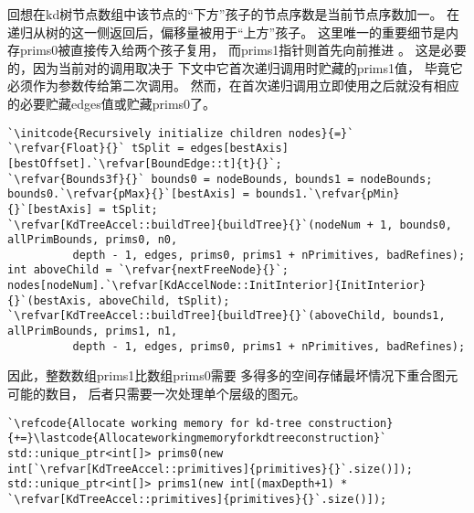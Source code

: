 回想在kd树节点数组中该节点的“下方”孩子的节点序数是当前节点序数加一。
在递归从树的这一侧返回后，偏移量被用于“上方”孩子。
这里唯一的重要细节是内存{\ttfamily prims0}被直接传入给两个孩子复用，
而{\ttfamily prims1}指针则首先向前推进
。
这是必要的，因为当前对的调用取决于
下文中它首次递归调用时贮藏的{\ttfamily prims1}值，
毕竟它必须作为参数传给第二次调用。
然而，在首次递归调用立即使用之后就没有相应的必要贮藏{\ttfamily edges}值或贮藏{\ttfamily prims0}了。
\begin{lstlisting}
`\initcode{Recursively initialize children nodes}{=}`
`\refvar{Float}{}` tSplit = edges[bestAxis][bestOffset].`\refvar[BoundEdge::t]{t}{}`;
`\refvar{Bounds3f}{}` bounds0 = nodeBounds, bounds1 = nodeBounds;
bounds0.`\refvar{pMax}{}`[bestAxis] = bounds1.`\refvar{pMin}{}`[bestAxis] = tSplit;
`\refvar[KdTreeAccel::buildTree]{buildTree}{}`(nodeNum + 1, bounds0, allPrimBounds, prims0, n0,
          depth - 1, edges, prims0, prims1 + nPrimitives, badRefines);
int aboveChild = `\refvar{nextFreeNode}{}`;
nodes[nodeNum].`\refvar[KdAccelNode::InitInterior]{InitInterior}{}`(bestAxis, aboveChild, tSplit);
`\refvar[KdTreeAccel::buildTree]{buildTree}{}`(aboveChild, bounds1, allPrimBounds, prims1, n1,
          depth - 1, edges, prims0, prims1 + nPrimitives, badRefines);
\end{lstlisting}

因此，整数数组{\ttfamily prims1}比数组{\ttfamily prims0}需要
多得多的空间存储最坏情况下重合图元可能的数目，
后者只需要一次处理单个层级的图元。
\begin{lstlisting}
`\refcode{Allocate working memory for kd-tree construction}{+=}\lastcode{Allocateworkingmemoryforkdtreeconstruction}`
std::unique_ptr<int[]> prims0(new int[`\refvar[KdTreeAccel::primitives]{primitives}{}`.size()]);
std::unique_ptr<int[]> prims1(new int[(maxDepth+1) * `\refvar[KdTreeAccel::primitives]{primitives}{}`.size()]);
\end{lstlisting}

